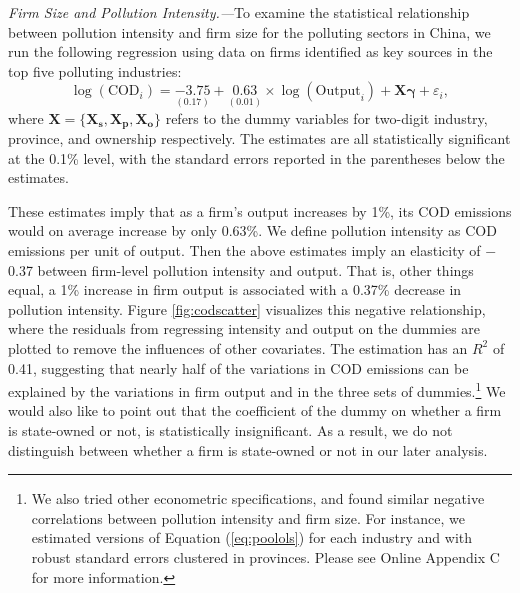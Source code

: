 \documentclass[AEJ]{AEA}
\renewcommand{\vec}[1]{\ensuremath{\mathbf{#1}}}
\begin{document}
\textit{Firm Size and Pollution Intensity.---}To examine the statistical relationship between pollution intensity and firm size for the polluting sectors in China, we run the following regression using data on firms identified as key sources in the top five polluting industries:
\begin{equation}
    \log (\text{COD}_i) = \underset{(0.17)}{-3.75} + \underset{(0.01)}{0.63} \times \log (\text{Output}_i) + \vec{X} \vec{\gamma} + \varepsilon_i,
\label{eq:poolols}
\end{equation}
where $\vec{X} = \{\vec{X_s}, \vec{X_p}, \vec{X_o}\}$ refers to the dummy variables for two-digit industry, province, and ownership respectively. The estimates are all statistically significant at the 0.1\% level, with the standard errors reported in the parentheses below the estimates.

These estimates imply that as a firm's output increases by 1\%, its COD emissions would on average increase by only 0.63\%. We define pollution intensity as COD emissions per unit of output. Then the above estimates imply an elasticity of $-$0.37 between firm-level pollution intensity and output. That is, other things equal, a 1\% increase in firm output is associated with a 0.37\% decrease in pollution intensity. Figure \ref{fig:codscatter} visualizes this negative relationship, where the residuals from regressing intensity and output on the dummies are plotted to remove the influences of other covariates. %
The estimation has an $R^2$ of 0.41, suggesting that nearly half of the variations in COD emissions can be explained by the variations in firm output and in the three sets of dummies.\footnote{We also tried other econometric specifications, and found similar negative correlations between pollution intensity and firm size. For instance, we estimated versions of Equation (\ref{eq:poolols}) for each industry and with robust standard errors clustered in provinces. Please see Online Appendix C for more information.} We would also like to point out that the coefficient of the dummy on whether a firm is state-owned or not, is statistically insignificant. As a result, we do not distinguish between whether a firm is state-owned or not in our later analysis.
\end{document}
